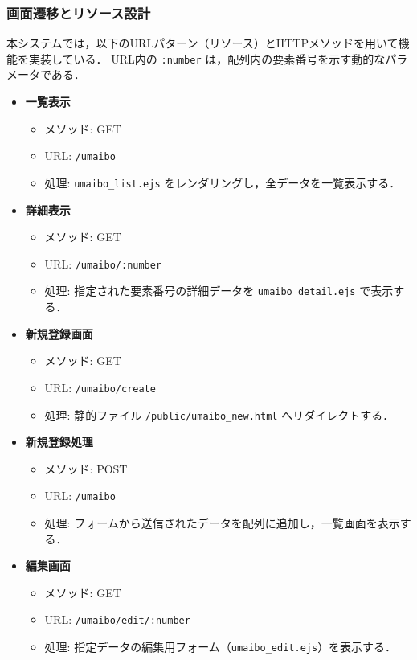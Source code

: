 \documentclass[uplatex,dvipdfmx]{jsarticle}
\begin{document}
\subsubsection{画面遷移とリソース設計}
本システムでは，以下のURLパターン（リソース）とHTTPメソッドを用いて機能を実装している．
URL内の \texttt{:number} は，配列内の要素番号を示す動的なパラメータである．

\begin{itemize}
    \item \textbf{一覧表示}
    \begin{itemize}
        \item メソッド: GET
        \item URL: \texttt{/umaibo}
        \item 処理: \texttt{umaibo\_list.ejs} をレンダリングし，全データを一覧表示する．
    \end{itemize}

    \item \textbf{詳細表示}
    \begin{itemize}
        \item メソッド: GET
        \item URL: \texttt{/umaibo/:number}
        \item 処理: 指定された要素番号の詳細データを \texttt{umaibo\_detail.ejs} で表示する．
    \end{itemize}
    
    \item \textbf{新規登録画面}
    \begin{itemize}
        \item メソッド: GET
        \item URL: \texttt{/umaibo/create}
        \item 処理: 静的ファイル \texttt{/public/umaibo\_new.html} へリダイレクトする．
    \end{itemize}

    \item \textbf{新規登録処理}
    \begin{itemize}
        \item メソッド: POST
        \item URL: \texttt{/umaibo}
        \item 処理: フォームから送信されたデータを配列に追加し，一覧画面を表示する．
    \end{itemize}

    \item \textbf{編集画面}
    \begin{itemize}
        \item メソッド: GET
        \item URL: \texttt{/umaibo/edit/:number}
        \item 処理: 指定データの編集用フォーム（\texttt{umaibo\_edit.ejs}）を表示する．
    \end{itemize}


\end{itemize}
\end{document}
